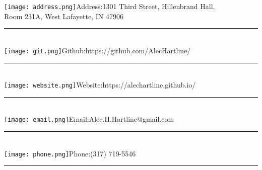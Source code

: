 \newcommand{\addressIcon}{\texttt{[image: address.png]}}%
\newcommand{\emailIcon}{\texttt{[image: email.png]}}%
\newcommand{\websiteIcon}{\texttt{[image: website.png]}}%
\newcommand{\phoneIcon}{\texttt{[image: phone.png]}}%
\newcommand{\gitIcon}{\texttt{[image: git.png]}}%
\newcommand{\separator}{\hspace{2.5cm}\rule[3pt]{5.5cm}{.5pt}\vspace{-5pt}\\}
\vspace{-.9cm}
\begin{flushleft}
	\addressIcon Address:\hspace{.5cm}1301 Third Street, Hillenbrand Hall,\\
	\hspace{2.5cm}Room 231A, West Lafayette, IN 47906\\
	\separator
	\gitIcon Github:\hspace{0.7cm}https://github.com/AlecHartline/\\
	\separator
	\websiteIcon Website:\hspace{0.55cm}https://alechartline.github.io/\\
	\separator
	\emailIcon Email:\hspace{0.85cm}Alec.H.Hartline@gmail.com \\
	\separator
	\phoneIcon Phone:\hspace{0.8cm}(317) 719-5546\\
	\hspace{2.5cm}\rule[3pt]{7.5cm}{0pt}\\
\end{flushleft}